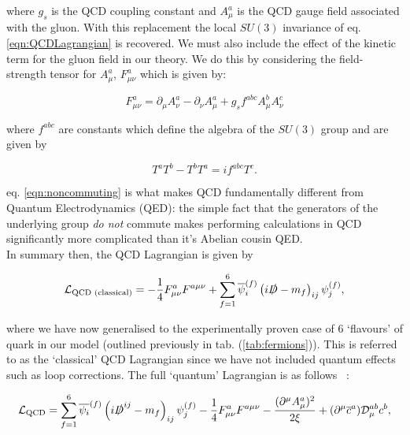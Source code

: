 	\noindent where $g_s$ is the QCD coupling constant and $A_\mu^a$ is the QCD gauge field associated with the gluon.
	With this replacement the local $SU(3)$ invariance of eq. \eqref{eqn:QCDLagrangian} is recovered.  We must also include
	the effect of the kinetic term for the gluon field in our theory.  We do this by considering the field-strength tensor for $A^a_\mu$,
	$F^a_{\mu\nu}$ which is given by:

	\begin{equation}
		F^a_{\mu\nu} = \partial_\mu A^a_\nu - \partial_\nu A^a_\mu + g_sf^{abc}A_\mu^bA_\nu^c
	\end{equation}

	\noindent where $f^{abc}$ are constants which define the algebra of the $SU(3)$ group and are given by

	\begin{equation}
		T^aT^b -T^bT^a = if^{abc}T^c.
		\label{eqn:noncommuting}
	\end{equation}

	eq. \eqref{eqn:noncommuting} is what makes QCD fundamentally different from Quantum Electrodynamics (QED):  the simple
	fact that the generators of the underlying group \emph{do not} commute makes performing calculations in QCD
	significantly more complicated than it's Abelian cousin QED.\\In summary then, the QCD Lagrangian is given by

	\begin{equation}
		\mathcal{L}_{\text{QCD (classical)}} = -\frac{1}{4}F_{\mu\nu}^aF^{a\mu\nu} + \sum_{f=1}^{6}\overline{\psi}_i^{(f)}\left(i\slashed D- m_f\right)_{ij}\psi_j^{(f)},
	\end{equation}

	where we have now generalised to the experimentally proven case of 6 `flavours' of quark in our model (outlined
	previously in tab. (\ref{tab:fermions})).  This is referred to as the `classical' QCD Lagrangian since we have not
	included quantum effects such as loop corrections.  The full `quantum' Lagrangian is as follows ~\cite{mutaBook}:

	\begin{equation}
		\mathcal{L}_{\text{QCD}}=\sum_{f=1}^{6}\overline{\psi_{i}}^{(f)}\left(i\slashed D^{ij}-m_f\right)_{ij}\psi_{j}^{(f)} -
			\frac{1}{4}F^a_{\mu\nu}F^{a\mu\nu} - \frac{(\partial^\mu A_{\mu}^a)^2}{2\xi} +
			(\partial^\mu \overline{c}^{a})\mathcal{D}_{\mu}^{ab}c^b,
			\label{eqn:fullQCD}
	\end{equation}

